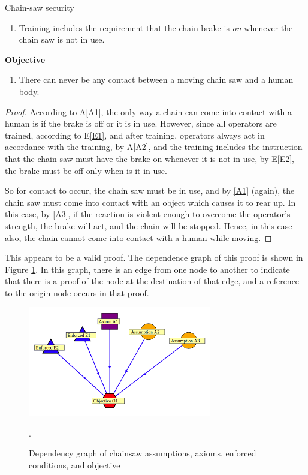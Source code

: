 \begin{example}{Chain-saw security}
\begin{enumerate}[{E}1.]
\item\label{E2} Training includes the requirement that the chain brake is {\em on} whenever
the chain saw is not in use.
\end{enumerate}

{\bf Objective}

\begin{enumerate}[{O}1.]
\item\label{O1} There can never be any contact between a moving chain saw and a human body.
\end{enumerate}

\begin{proof}
According to A\ref{A1}, the only way a chain can come into contact with a human
is if the brake is off or it is in use. However, since all operators are trained,
according to E\ref{E1}, and after training, operators always act in accordance with
the training, by A\ref{A2}, and the training includes the instruction that
the chain saw must have the brake on whenever it is not in use, by E\ref{E2}, 
the brake must be off only when is it in use.

So for contact to occur, the chain saw must be in use, and by \ref{A1} (again),
the chain saw must come into contact with an object which causes it to rear up.
In this case, by \ref{A3}, if the reaction is violent enough to overcome
the operator's strength, the brake will act, and the chain will be stopped.
Hence, in this case also, the chain cannot come into contact with a human
while moving.
\end{proof}

This appears to be a valid proof. The dependence graph of this proof is shown in Figure 
\ref{chainsawdependence}. In this graph, there is an edge from one node
to another to indicate that there is a proof of the node at the destination of
that edge, and a reference to the origin node occurs in that proof.
\begin{figure}
\centering
\includegraphics[width=8cm]{figures/chainsaw.png}
\caption{Dependency graph of chainsaw assumptions, axioms, enforced conditions, and objective}
\label{chainsawdependence}.
\end{figure}


\end{example}
